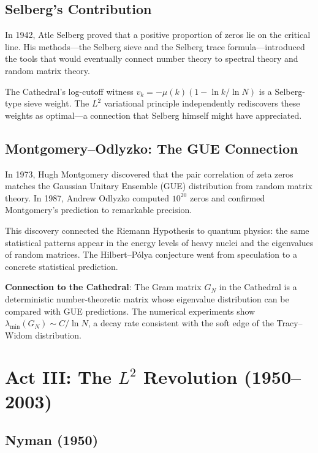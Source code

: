 \documentclass[11pt,a4paper]{article}
\begin{document}
\subsection{Selberg's Contribution}

In 1942, Atle Selberg proved that a positive proportion of zeros
lie on the critical line. His methods---the Selberg sieve and the
Selberg trace formula---introduced the tools that would eventually
connect number theory to spectral theory and random matrix theory.

The Cathedral's log-cutoff witness $v_k = -\mu(k)(1 - \ln k/\ln N)$
is a Selberg-type sieve weight. The $L^2$ variational principle
independently rediscovers these weights as optimal---a connection
that Selberg himself might have appreciated.

\subsection{Montgomery--Odlyzko: The GUE Connection}

In 1973, Hugh Montgomery discovered that the pair correlation of
zeta zeros matches the Gaussian Unitary Ensemble (GUE) distribution
from random matrix theory. In 1987, Andrew Odlyzko computed
$10^{20}$ zeros and confirmed Montgomery's prediction to remarkable
precision.

This discovery connected the Riemann Hypothesis to quantum physics:
the same statistical patterns appear in the energy levels of heavy
nuclei and the eigenvalues of random matrices. The Hilbert--P\'olya
conjecture went from speculation to a concrete statistical prediction.

\textbf{Connection to the Cathedral}: The Gram matrix $G_N$ in the
Cathedral is a deterministic number-theoretic matrix whose eigenvalue
distribution can be compared with GUE predictions. The numerical
experiments show $\lambda_{\min}(G_N) \sim C/\ln N$, a decay rate
consistent with the soft edge of the Tracy--Widom distribution.

\section{Act III: The $L^2$ Revolution (1950--2003)}

\subsection{Nyman (1950)}
\end{document}
